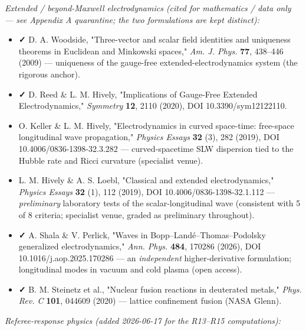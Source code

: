 \documentclass[11pt]{article}
\begin{document}
\emph{Extended / beyond-Maxwell electrodynamics (cited for mathematics / data only --- see Appendix A quarantine; the two formulations are kept distinct):}

\begin{itemize}
\item \textbf{✓} D. A. Woodside, "Three-vector and scalar field identities and uniqueness theorems in Euclidean and Minkowski spaces," \emph{Am. J. Phys.} \textbf{77}, 438--446 (2009) --- uniqueness of the gauge-free extended-electrodynamics system (the rigorous anchor).
\item \textbf{✓} D. Reed \& L. M. Hively, "Implications of Gauge-Free Extended Electrodynamics," \emph{Symmetry} \textbf{12}, 2110 (2020), DOI 10.3390/sym12122110.
\item O. Keller \& L. M. Hively, "Electrodynamics in curved space-time: free-space longitudinal wave propagation," \emph{Physics Essays} \textbf{32} (3), 282 (2019), DOI 10.4006/0836-1398-32.3.282 --- curved-spacetime SLW dispersion tied to the Hubble rate and Ricci curvature (specialist venue).
\item L. M. Hively \& A. S. Loebl, "Classical and extended electrodynamics," \emph{Physics Essays} \textbf{32} (1), 112 (2019), DOI 10.4006/0836-1398-32.1.112 --- \emph{preliminary} laboratory tests of the scalar-longitudinal wave (consistent with 5 of 8 criteria; specialist venue, graded as preliminary throughout).
\item \textbf{✓} A. Shala \& V. Perlick, "Waves in Bopp--Landé--Thomas--Podolsky generalized electrodynamics," \emph{Ann. Phys.} \textbf{484}, 170286 (2026), DOI 10.1016/j.aop.2025.170286 --- an \emph{independent} higher-derivative formulation; longitudinal modes in vacuum and cold plasma (open access).
\item \textbf{✓} B. M. Steinetz et al., "Nuclear fusion reactions in deuterated metals," \emph{Phys. Rev. C} \textbf{101}, 044609 (2020) --- lattice confinement fusion (NASA Glenn).
\end{itemize}

\emph{Referee-response physics (added 2026-06-17 for the R13--R15 computations):}
\end{document}
